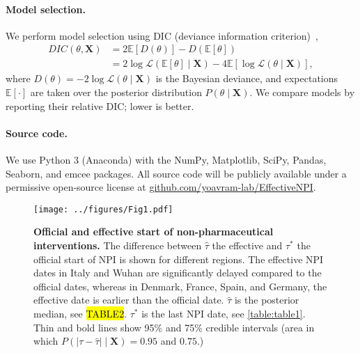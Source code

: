 \documentclass[12pt]{extarticle}
\let\vec\mathbf
\begin{document}
\paragraph*{Model selection.}
We perform model selection using DIC (deviance information criterion)~\citep{Spiegelhalter2002},
\begin{equation} \label{eq:DIC}
\begin{aligned}
DIC(\theta, \vec{X}) &= 2\mathbb{E}[D(\theta)] - D(\mathbb{E}[\theta])   \\
&= 2 \log\mathcal{L}(\mathbb{E}[\theta] \mid \vec{X}) - 4\mathbb{E}[\log\mathcal{L}(\theta \mid \vec{X})],
\end{aligned}
\end{equation}
where $D(\theta)=-2\log\mathcal{L}(\theta \mid \vec{X})$ is the Bayesian deviance, and expectations $\mathbb{E}[\cdot]$ are taken over the posterior distribution $P(\theta \mid \vec{X})$.
We compare models by reporting their relative DIC; lower is better.



\paragraph*{Source code.} 
We use Python 3 (Anaconda) with the NumPy, Matplotlib, SciPy, Pandas, Seaborn, and emcee packages.
All source code will be publicly available under a permissive open-source license at \href{http://github.com/yoavram-lab/EffectiveNPI}{github.com/yoavram-lab/EffectiveNPI}.



\begin{figure}[h]
    \centering
	\texttt{[image: ../figures/Fig1.pdf]}
    \caption{
    \textbf{Official and effective start of non-pharmaceutical interventions.}
    	The difference between $\hat{\tau}$ the effective and $\tau^*$ the official start of NPI is shown for different regions. The effective NPI dates in Italy and Wuhan are significantly delayed compared to the official dates, whereas in Denmark, France, Spain, and Germany, the effective date is earlier than the official date.
	$\hat{\tau}$ is the posterior median, see \hl{TABLE2}. $\tau^*$ is the last NPI date, see \autoref{table:table1}. Thin and bold lines show 95\% and 75\% credible intervals (area in which $P(|\tau - \hat{\tau}| \mid \vec{X}) = 0.95$ and $0.75$.)
    }
    \label{fig:fig1}
\end{figure}
\end{document}
